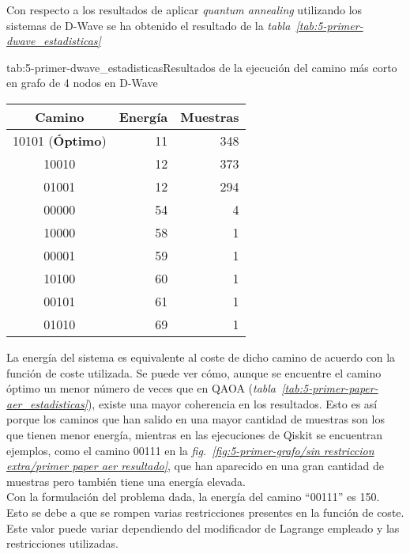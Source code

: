 Con respecto a los resultados de aplicar \textit{quantum annealing} utilizando los sistemas de D-Wave se ha obtenido el resultado de la \textit{tabla~\ref{tab:5-primer-dwave_estadisticas}}

\begin{table}[Resultados D-Wave {--} artículo de Urgelles et al.]{tab:5-primer-dwave_estadisticas}{Resultados de la ejecución del camino más corto en grafo de 4 nodos en D-Wave}
  \centering
  \begin{tabular}{|c|r|r|}
    \hline
    \textbf{Camino}         & \textbf{Energía} & \textbf{Muestras} \\ \hline
    10101 (\textbf{Óptimo}) & 11               & 348               \\ \hline
    10010                   & 12               & 373               \\ \hline
    01001                   & 12               & 294               \\ \hline
    00000                   & 54               &   4               \\ \hline
    10000                   & 58               &   1               \\ \hline
    00001                   & 59               &   1               \\ \hline
    10100                   & 60               &   1               \\ \hline
    00101                   & 61               &   1               \\ \hline
    01010                   & 69               &   1               \\ \hline
  \end{tabular}
\end{table}

La energía del sistema es equivalente al coste de dicho camino de acuerdo con la función de coste utilizada.
Se puede ver cómo, aunque se encuentre el camino óptimo un menor número de veces que en QAOA (\textit{tabla~\ref{tab:5-primer-paper-aer_estadisticas}}), existe una mayor coherencia en los resultados.
Esto es así porque los caminos que han salido en una mayor cantidad de muestras son los que tienen menor energía, mientras en las ejecuciones de Qiskit se encuentran ejemplos, como el camino 00111 en la
\textit{fig.~\ref{fig:5-primer-grafo/sin restriccion extra/primer paper aer resultado}}, que han aparecido en una gran cantidad de muestras pero también tiene una energía elevada.
\\
Con la formulación del problema dada, la energía del camino ``00111'' es 150.
Esto se debe a que se rompen varias restricciones presentes en la función de coste.
Este valor puede variar dependiendo del modificador de Lagrange empleado y las restricciones utilizadas.

